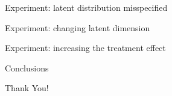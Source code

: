 \documentclass[10pt]{beamer}
\begin{document}
\begin{frame}{Experiment: latent distribution misspecified}
    
\end{frame}

\begin{frame}{Experiment: changing latent dimension}
    
\end{frame}

\begin{frame}{Experiment: increasing the treatment effect}
    
\end{frame}

\begin{frame}{Conclusions}
    
\end{frame}

{
\begin{frame}[standout]
\thispagestyle{empty}
  {\LARGE Thank You!}
\end{frame}
}
\end{document}
